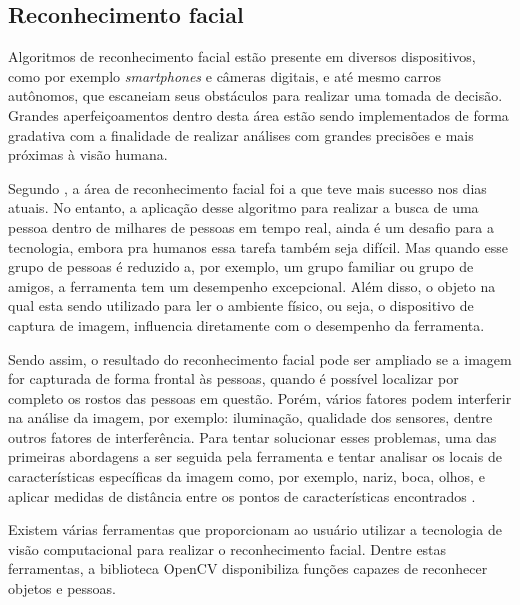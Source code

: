 \subsection{Reconhecimento facial}

Algoritmos de reconhecimento facial estão presente em diversos dispositivos, como por exemplo \textit{smartphones} e câmeras digitais, e até mesmo carros autônomos, que escaneiam seus obstáculos para realizar uma tomada de decisão. Grandes aperfeiçoamentos dentro desta área estão sendo implementados de forma gradativa com a finalidade de realizar análises com grandes precisões e mais próximas à visão humana.

Segundo , a área de reconhecimento facial foi a que teve mais sucesso nos dias atuais. No entanto, a aplicação desse algoritmo para realizar a busca de uma pessoa dentro de milhares de pessoas em tempo real, ainda é um desafio para a tecnologia, embora pra humanos essa tarefa também seja difícil. Mas quando esse grupo de pessoas é reduzido a, por exemplo, um grupo familiar ou grupo de amigos, a ferramenta tem um desempenho excepcional. Além disso, o objeto na qual esta sendo utilizado para ler o ambiente físico, ou seja, o dispositivo de captura de imagem, influencia diretamente com o desempenho da ferramenta.

Sendo assim, o resultado do reconhecimento facial pode ser ampliado se a imagem for capturada de forma frontal às pessoas, quando é possível localizar por completo os rostos das pessoas em questão. Porém, vários fatores podem interferir na análise da imagem, por exemplo: iluminação, qualidade dos sensores, dentre outros fatores de interferência. Para tentar solucionar esses problemas, uma das primeiras abordagens a ser seguida pela ferramenta e tentar analisar os locais de características específicas da imagem como, por exemplo, nariz, boca, olhos, e aplicar medidas de distância entre os pontos de características encontrados \cite{SZELISKI2010}.

Existem várias ferramentas que proporcionam ao usuário utilizar a tecnologia de visão computacional para realizar o reconhecimento facial. Dentre estas ferramentas, a biblioteca OpenCV disponibiliza funções capazes de reconhecer objetos e pessoas. 